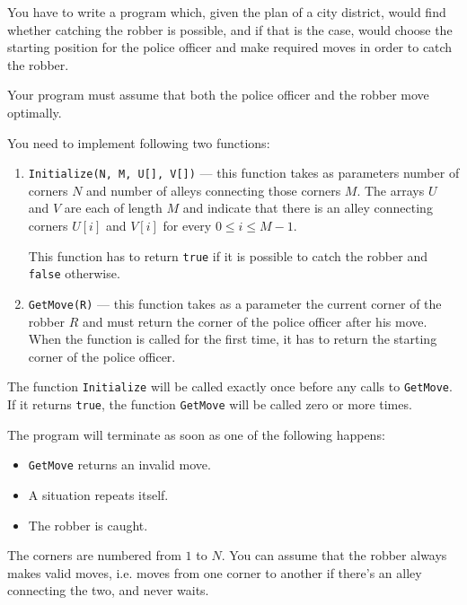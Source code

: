 \documentclass{boi2014}
\newcommand{\method}[1]{{\tt #1}}
\newcommand{\constant}[1]{{\tt #1}}
\begin{document}
    \Task
    You have to write a program which, given the plan of a city district, would
    find whether catching the robber is possible, and if that is the case, would
    choose the starting position for the police officer and make required moves
    in order to catch the robber.
    
    Your program must assume that both the police officer and the robber move
    optimally.

    \Implementation
    You need to implement following two functions:
    \begin{enumerate}
        \item \method{Initialize(N, M, U[], V[])} --- this function takes as
        parameters number of corners $N$ and number of alleys connecting those
        corners $M$. The arrays $U$ and $V$ are each of length $M$ and indicate
        that there is an alley connecting corners $U[i]$ and $V[i]$ for every $0
        \le i \le M - 1$.

        This function has to return \constant{true} if it is possible to catch
        the robber and \constant{false} otherwise.

        \item \method{GetMove(R)} --- this function takes as a parameter the
        current corner of the robber $R$ and must return the corner of the
        police officer after his move. When the function is called for the first
        time, it has to return the starting corner of the police officer.
    \end{enumerate}

    The function \method{Initialize} will be called exactly once before any
    calls to \method{GetMove}. If it returns \constant{true}, the function
    \method{GetMove} will be called zero or more times.

    The program will terminate as soon as one of the following happens:
    \begin{itemize}
        \item \method{GetMove} returns an invalid move.
        \item A situation repeats itself.
        \item The robber is caught.
    \end{itemize}

    The corners are numbered from $1$ to $N$. You can assume that the robber
    always makes valid moves, i.e. moves from one corner to another if there's
    an alley connecting the two, and never waits.
\end{document}
